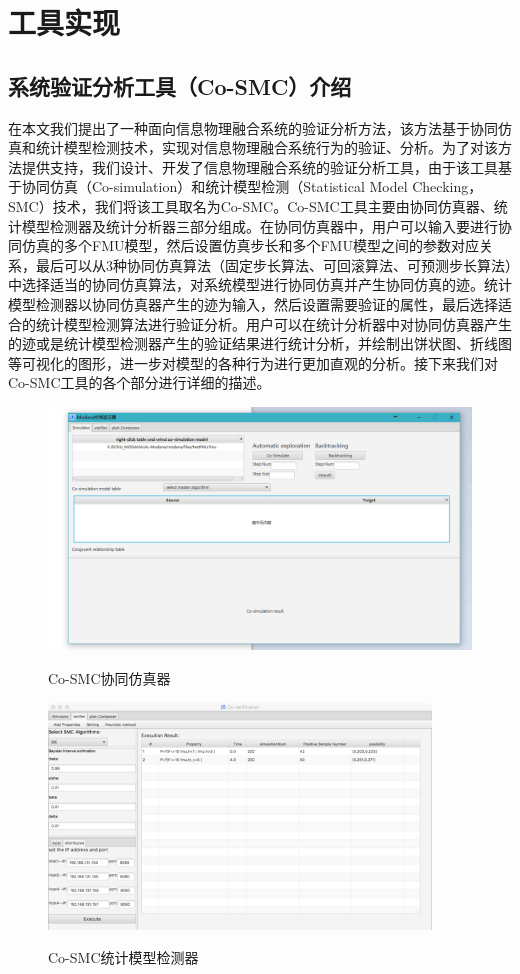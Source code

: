 \chapter{工具实现}
\label{ch5}

\section{系统验证分析工具（Co-SMC）介绍}
在本文我们提出了一种面向信息物理融合系统的验证分析方法，该方法基于协同仿真和统计模型检测技术，实现对信息物理融合系统行为的验证、分析。为了对该方法提供支持，我们设计、开发了信息物理融合系统的验证分析工具，由于该工具基于协同仿真（Co-simulation）和统计模型检测（Statistical Model Checking，SMC）技术，我们将该工具取名为Co-SMC。Co-SMC工具主要由协同仿真器、统计模型检测器及统计分析器三部分组成。在协同仿真器中，用户可以输入要进行协同仿真的多个FMU模型，然后设置仿真步长和多个FMU模型之间的参数对应关系，最后可以从3种协同仿真算法（固定步长算法、可回滚算法、可预测步长算法）中选择适当的协同仿真算法，对系统模型进行协同仿真并产生协同仿真的迹。统计模型检测器以协同仿真器产生的迹为输入，然后设置需要验证的属性，最后选择适合的统计模型检测算法进行验证分析。用户可以在统计分析器中对协同仿真器产生的迹或是统计模型检测器产生的验证结果进行统计分析，并绘制出饼状图、折线图等可视化的图形，进一步对模型的各种行为进行更加直观的分析。接下来我们对Co-SMC工具的各个部分进行详细的描述。
\begin{figure}[htbp]
	\centering
	{\includegraphics[width=6.0in]{fig/5/tool4.png}}
	\caption{Co-SMC协同仿真器}\label{tool-1}
\end{figure}
\begin{figure}[htbp]
	\centering
	{\includegraphics[width=4.0in]{fig/5/tool2.png}}
	\caption{Co-SMC统计模型检测器}\label{tool-2}
\end{figure}
